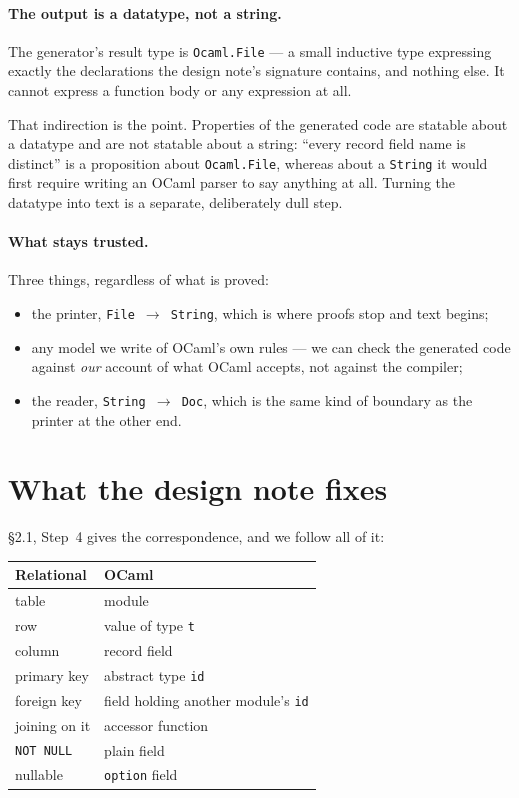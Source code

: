 \documentclass[11pt,a4paper]{article}
\begin{document}
\paragraph{The output is a datatype, not a string.} The generator's result
type is \texttt{Ocaml.File} --- a small inductive type expressing exactly the
declarations the design note's signature contains, and nothing else. It cannot
express a function body or any expression at all.

That indirection is the point. Properties of the generated code are statable
about a datatype and are not statable about a string: ``every record field
name is distinct'' is a proposition about \texttt{Ocaml.File}, whereas about a
\texttt{String} it would first require writing an OCaml parser to say anything
at all. Turning the datatype into text is a separate, deliberately dull step.

\paragraph{What stays trusted.} Three things, regardless of what is proved:

\begin{itemize}
  \item the printer, \texttt{File $\to$ String}, which is where proofs stop
        and text begins;
  \item any model we write of OCaml's own rules --- we can check the generated
        code against \emph{our} account of what OCaml accepts, not against the
        compiler;
  \item the reader, \texttt{String $\to$ Doc}, which is the same kind of
        boundary as the printer at the other end.
\end{itemize}

\section{What the design note fixes}

\S2.1, Step~4 gives the correspondence, and we follow all of it:

\begin{center}
\begin{tabular}{@{}ll@{}}
\hline
\textbf{Relational} & \textbf{OCaml} \\
\hline
table & module \\
row & value of type \texttt{t} \\
column & record field \\
primary key & abstract type \texttt{id} \\
foreign key & field holding another module's \texttt{id} \\
joining on it & accessor function \\
\texttt{NOT NULL} & plain field \\
nullable & \texttt{option} field \\
\hline
\end{tabular}
\end{center}
\end{document}
